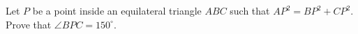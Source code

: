 Let $P$ be a point inside an equilateral triangle $ABC$ such that $AP^2=BP^2+CP^2$. Prove that $\angle BPC=150^\circ$.
